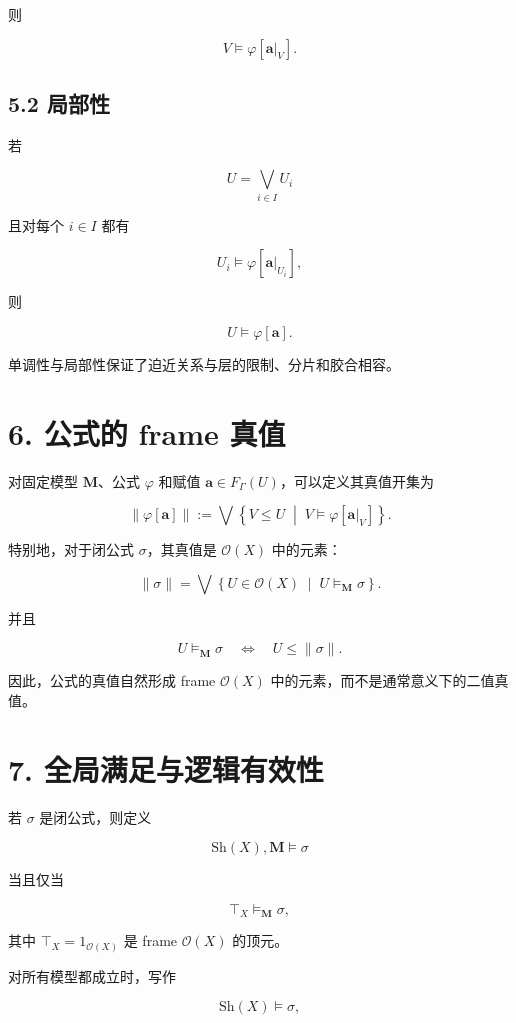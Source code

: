 \documentclass{ctexart}
\begin{document}
则

\[
V\models\varphi[\mathbf a|_V].
\]

\subsection*{5.2 局部性}

若

\[
U=\bigvee_{i\in I}U_i
\]

且对每个 $i\in I$ 都有

\[
U_i\models\varphi[\mathbf a|_{U_i}],
\]

则

\[
U\models\varphi[\mathbf a].
\]

单调性与局部性保证了迫近关系与层的限制、分片和胶合相容。

\section*{6. 公式的 frame 真值}

对固定模型 $\mathbf M$、公式 $\varphi$ 和赋值 $\mathbf a\in F_\Gamma(U)$，可以定义其真值开集为

\[
\|\varphi[\mathbf a]\|
:=
\bigvee
\left\{
V\le U
\;\middle|\;
V\models\varphi[\mathbf a|_V]
\right\}.
\]

特别地，对于闭公式 $\sigma$，其真值是 $\mathcal O(X)$ 中的元素：

\[
\|\sigma\|
=
\bigvee
\left\{
U\in\mathcal O(X)
\;\middle|\;
U\models_{\mathbf M}\sigma
\right\}.
\]

并且

\[
U\models_{\mathbf M}\sigma
\quad\Longleftrightarrow\quad
U\le \|\sigma\|.
\]

因此，公式的真值自然形成 frame $\mathcal O(X)$ 中的元素，而不是通常意义下的二值真值。

\section*{7. 全局满足与逻辑有效性}

若 $\sigma$ 是闭公式，则定义

\[
\mathrm{Sh}(X),\mathbf M\models\sigma
\]

当且仅当

\[
\top_X\models_{\mathbf M}\sigma,
\]

其中 $\top_X=1_{\mathcal O(X)}$ 是 frame $\mathcal O(X)$ 的顶元。

对所有模型都成立时，写作

\[
\mathrm{Sh}(X)\models\sigma,
\]
\end{document}
